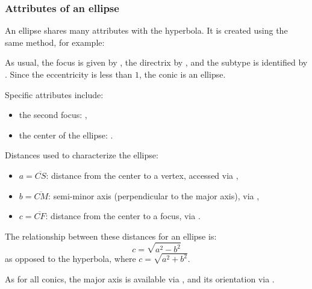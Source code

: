 \subsubsection{Attributes of an ellipse}

An ellipse shares many attributes with the hyperbola. It is created using the same method, for example:


   \begin{center}
   \end{center}


\vspace{1em}

As usual, the focus is given by , the directrix by , and the subtype is identified by . Since the eccentricity is less than $1$, the conic is an ellipse.

\vspace{1em}

Specific attributes include:
\begin{itemize}
  \item the second focus: ,
  \item the center of the ellipse: .
\end{itemize}

\vspace{1em}

Distances used to characterize the ellipse:
\begin{itemize}
  \item $a = \overline{CS}$: distance from the center to a vertex, accessed via ,
  \item $b = \overline{CM}$: semi-minor axis (perpendicular to the major axis), via ,
  \item $c = \overline{CF}$: distance from the center to a focus, via .
\end{itemize}

\vspace{1em}

The relationship between these distances for an ellipse is:
\[
  c = \sqrt{a^2 - b^2}
\]
as opposed to the hyperbola, where $c = \sqrt{a^2 + b^2}$.

\vspace{1em}

As for all conics, the major axis is available via , and its orientation via .

